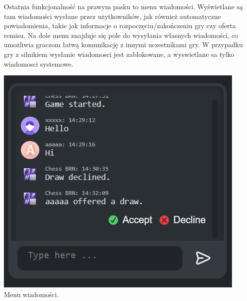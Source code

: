 \documentclass[12pt,a4paper]{article}
\begin{document}
\begin{minipage}[t]{0.45\textwidth} 
    \vspace{0pt} 
    \justifying 
    \noindent 
    Ostatnia funkcjonalność na prawym pasku to menu wiadomości. Wyświetlane są tam wiadomości wysłane przez użytkowników, jak również automatyczne powiadomienia, takie jak informacje o rozpoczęciu/zakończeniu gry czy oferta remisu. Na dole menu znajduje się pole do wysyłania własnych wiadomości, co umożliwia graczom łatwą komunikację z innymi uczestnikami gry. W przypadku gry z silnikiem wysłanie wiadomosci jest zablokowane, a wyswietlane sa tylko wiadomosci systemowe.
\end{minipage} 
\hfill 
\begin{minipage}[t]{0.45\textwidth} 
    \vspace{0pt} 
    \centering 
    \includegraphics[width=\linewidth]{images/ins_min_mess.png} 
    Menu wiadomości.
\end{minipage}

\newpage
\end{document}
